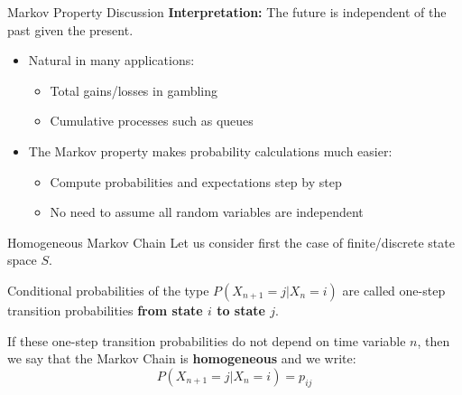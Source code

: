 \documentclass[8pt]{beamer}
\begin{document}
\begin{frame}{Markov Property Discussion}
\textbf{Interpretation:}  
The future is independent of the past \alert{given the present}.  

\bigskip

\begin{itemize}
  \item Natural in many applications:
    \begin{itemize}
      \item Total gains/losses in gambling
      \item Cumulative processes such as queues
    \end{itemize}
  
  \bigskip
  
  \item The Markov property makes probability calculations much easier:
    \begin{itemize}
      \item Compute probabilities and expectations step by step
      \item No need to assume all random variables are independent
    \end{itemize}
\end{itemize}
\end{frame}


\begin{frame}{Homogeneous Markov Chain}
Let us  consider first the case of finite/discrete state space $S$.

\vspace{3mm}

Conditional probabilities of the type $P(X_{n+1}=j|X_n=i)$ are called  one-step transition probabilities \textbf{from state $i$ to state $j$}.
\vspace{3mm}

If these one-step transition probabilities do not depend on time variable $n$, then
we say that the Markov Chain is \textbf{homogeneous} and we write:
\begin{equation*}
P(X_{n+1}=j|X_n=i)=p_{ij}
\end{equation*}
\end{frame}
\end{document}
